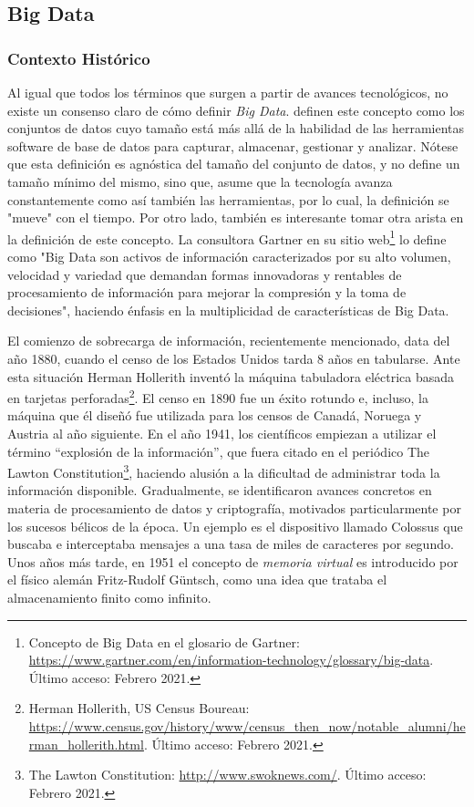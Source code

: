 \subsection{Big Data}
\subsubsection{Contexto Histórico}
Al igual que todos los términos que surgen a partir de avances tecnológicos, no existe un consenso claro de cómo definir \textit{Big Data}. \cite{manyika2011big} definen este concepto como los conjuntos de datos cuyo tamaño está más allá de la habilidad de las herramientas software de base de datos para capturar, almacenar, gestionar y analizar. Nótese que esta definición es agnóstica del tamaño del conjunto de datos, y no define un tamaño mínimo del mismo, sino que, asume que la tecnología avanza constantemente como así también las herramientas, por lo cual, la definición se "mueve" con el tiempo. Por otro lado, también es interesante tomar otra arista en la definición de este concepto. La consultora Gartner en su sitio web\footnote{Concepto de Big Data en el glosario de Gartner: \url{https://www.gartner.com/en/information-technology/glossary/big-data}. Último acceso: Febrero 2021.} lo define como "Big Data son activos de información caracterizados por su alto volumen, velocidad y variedad que demandan formas innovadoras y rentables de procesamiento de información para mejorar la compresión y la toma de decisiones", haciendo énfasis en la multiplicidad de características de Big Data.

\bigskip El comienzo de sobrecarga de información, recientemente mencionado, data del año 1880, cuando el censo de los Estados Unidos tarda 8 años en tabularse. Ante esta situación Herman Hollerith inventó la máquina tabuladora eléctrica basada en tarjetas perforadas\footnote{Herman Hollerith, US Census Boureau: \url{https://www.census.gov/history/www/census_then_now/notable_alumni/herman_hollerith.html}. Último acceso: Febrero 2021.}. El censo en 1890 fue un éxito rotundo e, incluso, la máquina que él diseñó fue  utilizada para los censos de Canadá, Noruega y Austria al año siguiente. En el año 1941, los científicos empiezan a utilizar el término “explosión de la información”, que fuera  citado en el periódico The Lawton Constitution\footnote{The Lawton Constitution: \url{http://www.swoknews.com/}.  Último acceso: Febrero 2021.}, haciendo alusión a la dificultad de administrar toda la información disponible. Gradualmente, se identificaron avances concretos en materia de procesamiento de datos y criptografía, motivados particularmente por los sucesos bélicos de la época. Un ejemplo es el dispositivo llamado Colossus \citep{copeland2004colossus} que buscaba e interceptaba mensajes a una tasa de miles de caracteres por segundo. Unos años más tarde, en 1951 el concepto de \textit{memoria virtual} es introducido por el físico alemán Fritz-Rudolf Güntsch, como una idea que trataba el almacenamiento finito como infinito.

